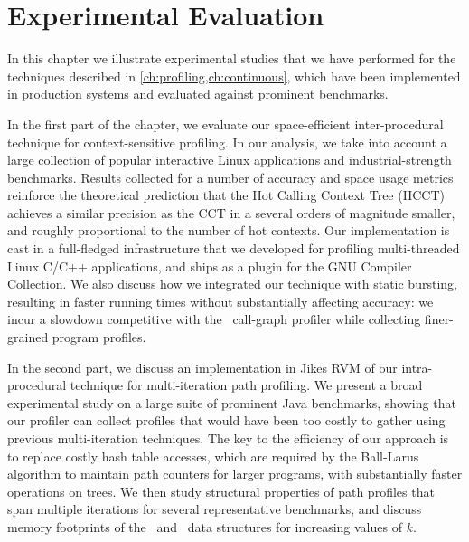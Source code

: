 
\chapter{Experimental Evaluation}
\label{ch:experiments}

In this chapter we illustrate experimental studies that we have performed for the techniques described in \mychapter\ref{ch:profiling,ch:continuous}, which have been implemented in production systems and evaluated against prominent benchmarks.  


In the first part of the chapter, we evaluate our space-efficient inter-procedural technique for context-sensitive profiling. In our analysis, we take into account a large collection of popular interactive Linux applications and industrial-strength benchmarks. Results collected for a number of accuracy and space usage metrics reinforce the theoretical prediction that the Hot Calling Context Tree (HCCT) achieves a similar precision as the CCT in a several orders of magnitude smaller, and roughly proportional to the number of hot contexts. Our implementation is cast in a full-fledged infrastructure that we developed for profiling multi-threaded Linux C/C++ applications, and ships as a plugin for the GNU Compiler Collection. We also discuss how we integrated our technique with static bursting, resulting in faster running times without substantially affecting accuracy: we incur a slowdown competitive with the \gprof\ call-graph profiler while collecting finer-grained program profiles. 

In the second part, we discuss an implementation in Jikes RVM of our intra-procedural technique for multi-iteration path profiling. We present a broad experimental study on a large suite of prominent Java benchmarks, showing that our profiler can collect profiles that would have been too costly to gather using previous multi-iteration techniques. The key to the efficiency of our approach is to replace costly hash table accesses, which are  required by the Ball-Larus algorithm to maintain path counters for larger programs, with substantially faster operations on trees. We then study structural properties of path profiles that span multiple iterations for several representative benchmarks, and discuss memory footprints of the \ksf\ and \kipf\ data structures for increasing values of $k$.

